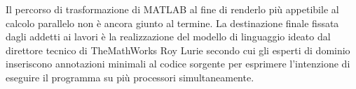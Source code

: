 Il percorso di trasformazione di MATLAB al fine di renderlo pi\`u appetibile al calcolo parallelo non \`e ancora giunto al termine. \newline La destinazione finale fissata 
dagli addetti ai lavori \`e la realizzazione del modello di linguaggio ideato dal direttore tecnico di TheMathWorks Roy Lurie \cite{Lurie2007}
secondo cui gli esperti di dominio inseriscono annotazioni minimali al codice sorgente per esprimere l'intenzione di eseguire il programma 
su pi\`u processori simultaneamente.
